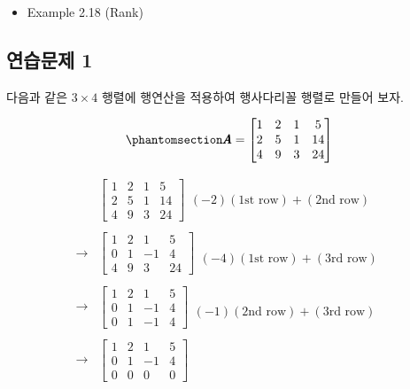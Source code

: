 \documentclass[
  11pt,
  a4paper,
  oneside]{scrbook}
\providecommand{\tightlist}{%
  \setlength{\itemsep}{0pt}\setlength{\parskip}{0pt}}\usepackage{longtable,booktabs,array}
\theoremstyle{definition}
\theoremstyle{definition}
\theoremstyle{plain}
\theoremstyle{remark}
\begin{document}
\begin{itemize}
\tightlist
\item
  Example 2.18 (Rank)
\end{itemize}

\subsection{연습문제 1}\label{uxc5f0uxc2b5uxbb38uxc81c-1}

다음과 같은 \(3 \times 4\) 행렬에 행연산을 적용하여 행사다리꼴 행렬로
만들어 보자.

\begin{equation}\phantomsection\label{eq-matrix-9-1}{
\pmb A =
\begin{bmatrix}
1 & 2 & 1 & 5\\
2 & 5 & 1 & 14 \\
4 & 9 & 3 & 24
\end{bmatrix}
}\end{equation}

\[
\begin{aligned}
&
\begin{bmatrix}
1 & 2 & 1 & 5\\
2 & 5 & 1 & 14 \\
4 & 9 & 3 & 24
\end{bmatrix}
\begin{array}{c}
\\
(-2)(\text{1st row}) + (\text{2nd row}) 
\\
\end{array} \\
& \\
\rightarrow
& 
\begin{bmatrix}
1 & 2 & 1 & 5\\
0 & 1 & -1 & 4 \\
4 & 9 & 3 & 24
\end{bmatrix}
\begin{array}{c}
\\
\\
 (-4)(\text{1st row}) + (\text{3rd row}) 
\end{array} \\
& \\
\rightarrow
& 
\begin{bmatrix}
1 & 2 & 1 & 5\\
0 & 1 & -1 & 4 \\
0 & 1 & -1 & 4
\end{bmatrix}
\begin{array}{c}
\\
\\
 (-1) (\text{2nd row}) + (\text{3rd row})  
\end{array} \\
& \\
\rightarrow
&  
\begin{bmatrix}
1 & 2 & 1 & 5\\
0 & 1 & -1 & 4 \\
0 & 0 & 0 & 0
\end{bmatrix}
\end{aligned}
\]
\end{document}
